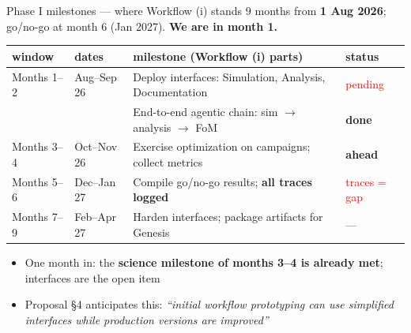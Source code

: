 \documentclass[aspectratio=169,10pt]{beamer}
\begin{document}
\begin{frame}{Phase I milestones --- where Workflow (i) stands}
\small
9 months from \textbf{1 Aug 2026}; go/no-go at month 6 (Jan 2027). \textbf{We are in month 1.}
\vspace{0.6em}
\begin{center}
\scriptsize
\begin{tabular}{@{}llll@{}}
\hline
\textbf{window} & \textbf{dates} & \textbf{milestone (Workflow (i) parts)} & \textbf{status} \\
\hline
Months 1--2 & Aug--Sep 26 & Deploy interfaces: Simulation, Analysis, Documentation & \textcolor{red}{pending} \\
            &             & End-to-end agentic chain: sim $\rightarrow$ analysis $\rightarrow$ FoM & \textcolor{okgreen}{\textbf{done}} \\[0.3em]
Months 3--4 & Oct--Nov 26 & Exercise optimization on campaigns; collect metrics & \textcolor{okgreen}{\textbf{ahead}} \\[0.3em]
Months 5--6 & Dec--Jan 27 & Compile go/no-go results; \textbf{all traces logged} & \textcolor{red}{traces = gap} \\[0.3em]
Months 7--9 & Feb--Apr 27 & Harden interfaces; package artifacts for Genesis & --- \\
\hline
\end{tabular}
\end{center}
\vspace{0.6em}
\begin{itemize}\small
  \item One month in: the \textbf{science milestone of months 3--4 is already met}; interfaces are the open item
  \item Proposal \S4 anticipates this: \emph{``initial workflow prototyping can use simplified interfaces while production versions are improved''}
\end{itemize}
\end{frame}
\end{document}

